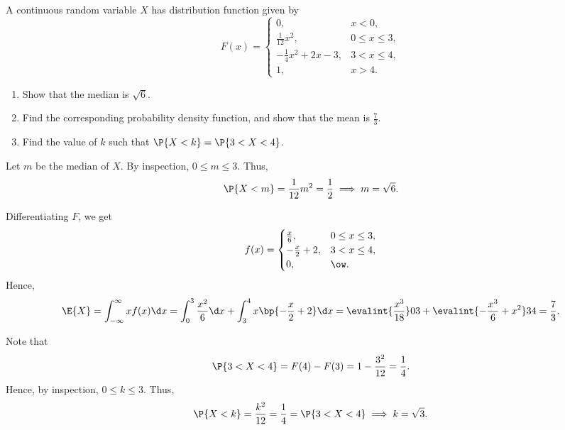 \begin{problem}
    A continuous random variable $X$ has distribution function given by \[F(x) = \begin{cases}
        0, & x < 0,\\
        \frac1{12} x^2, & 0 \leq x \leq 3,\\
        -\frac14 x^2 + 2x - 3, & 3 < x \leq 4,\\
        1, & x > 4.
    \end{cases}\]

    \begin{enumerate}
        \item Show that the median is $\sqrt{6}$.
        \item Find the corresponding probability density function, and show that the mean is $\frac{7}{3}$.
        \item Find the value of $k$ such that $\P{X < k} = \P{3 < X < 4}$.
    \end{enumerate}
\end{problem}
\begin{solution}
    \begin{ppart}
        Let $m$ be the median of $X$. By inspection, $0 \leq m \leq 3$. Thus, \[\P{X < m} = \frac1{12} m^2 = \frac12 \implies m = \sqrt{6}.\]
    \end{ppart}
    \begin{ppart}
        Differentiating $F$, we get \[f(x) = \begin{cases}
            \frac{x}6, & 0 \leq x \leq 3,\\
            -\frac{x}2 + 2, & 3 < x \leq 4,\\
            0, & \ow.
        \end{cases}\]
        Hence, \[\E{X} = \int_{-\infty}^{\infty} x f(x) \d x = \int_0^3 \frac{x^2}6 \d x + \int_3^4 x\bp{-\frac{x}{2} + 2} \d x = \evalint{\frac{x^3}{18}}03 + \evalint{-\frac{x^3}6 + x^2}34 = \frac73.\]
    \end{ppart}
    \begin{ppart}
        Note that \[\P{3 < X < 4} = F(4) - F(3) = 1 - \frac{3^2}{12} = \frac14.\] Hence, by inspection, $0 \leq k \leq 3$. Thus, \[\P{X < k} = \frac{k^2}{12} = \frac14 = \P{3 < X < 4} \implies k = \sqrt{3}.\]
    \end{ppart}
\end{solution}

